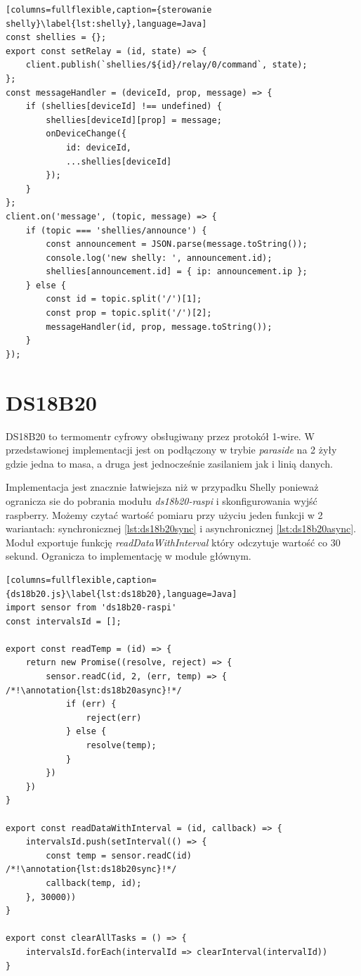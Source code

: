 \newpage
\begin{lstlisting}[columns=fullflexible,caption={sterowanie shelly}\label{lst:shelly},language=Java]
const shellies = {};
export const setRelay = (id, state) => {
	client.publish(`shellies/${id}/relay/0/command`, state);
};
const messageHandler = (deviceId, prop, message) => {
	if (shellies[deviceId] !== undefined) {
		shellies[deviceId][prop] = message;
		onDeviceChange({
			id: deviceId,
			...shellies[deviceId]
		});
	}
};
client.on('message', (topic, message) => {
	if (topic === 'shellies/announce') {
		const announcement = JSON.parse(message.toString());
		console.log('new shelly: ', announcement.id);
		shellies[announcement.id] = { ip: announcement.ip };
	} else {
		const id = topic.split('/')[1];
		const prop = topic.split('/')[2];
		messageHandler(id, prop, message.toString());
	}
});
\end{lstlisting}
\section{DS18B20}
DS18B20 to termomentr cyfrowy obsługiwany przez protokół 1-wire. W przedstawionej implementacji jest on podłączony w trybie \textit{paraside} na 2 żyły gdzie jedna to masa, a druga jest jednocześnie zasilaniem jak i linią danych. 
\par Implementacja jest znacznie łatwiejsza niż w przypadku Shelly ponieważ ogranicza sie do pobrania modułu \textit{ds18b20-raspi} i skonfigurowania wyjść raspberry. Możemy czytać wartość pomiaru przy użyciu jeden funkcji w 2 wariantach: synchronicznej \ref{lst:ds18b20sync} i asynchronicznej \ref{lst:ds18b20async}. Moduł exportuje funkcję \textit{readDataWithInterval} który odczytuje wartość co 30 sekund. Ogranicza to implementację w module głównym.
\newpage
\begin{lstlisting}[columns=fullflexible,caption={ds18b20.js}\label{lst:ds18b20},language=Java]
import sensor from 'ds18b20-raspi'
const intervalsId = [];

export const readTemp = (id) => {
    return new Promise((resolve, reject) => {
        sensor.readC(id, 2, (err, temp) => { /*!\annotation{lst:ds18b20async}!*/
            if (err) {
                reject(err)
            } else {
                resolve(temp);
            }
        })
    })
}

export const readDataWithInterval = (id, callback) => {
    intervalsId.push(setInterval(() => {
        const temp = sensor.readC(id) /*!\annotation{lst:ds18b20sync}!*/
        callback(temp, id);
    }, 30000))
}

export const clearAllTasks = () => {
    intervalsId.forEach(intervalId => clearInterval(intervalId))
}
\end{lstlisting}